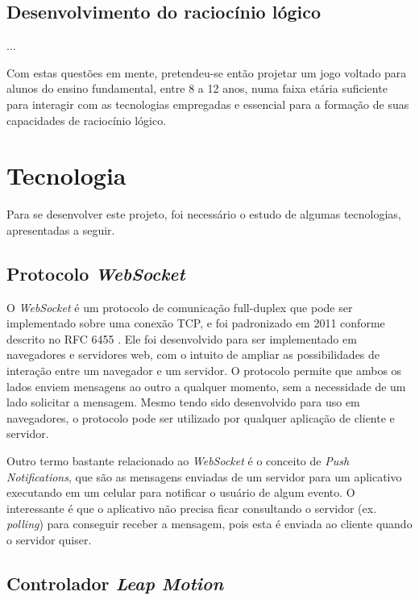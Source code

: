 \subsection{Desenvolvimento do raciocínio lógico}
...

Com estas questões em mente, pretendeu-se então projetar um jogo voltado para
alunos do ensino fundamental, entre 8 a 12 anos, numa faixa etária suficiente
para interagir com as tecnologias empregadas e essencial para a formação de
suas capacidades de raciocínio lógico.


\section{Tecnologia}\label{sec-tecnologia}

Para se desenvolver este projeto, foi necessário o estudo de algumas tecnologias, apresentadas a seguir. 
\subsection{Protocolo \textit{WebSocket}}\label{subsec-teo-websocket}

O \textit{WebSocket} é um protocolo de comunicação full-duplex que pode ser implementado
sobre uma conexão TCP, e foi padronizado em 2011 conforme descrito no RFC 6455
\cite{RFC:2011:websocket}. Ele foi desenvolvido para ser implementado em 
navegadores e servidores web, com o intuito de ampliar as possibilidades de
interação entre um navegador e um servidor. O protocolo permite que ambos os 
lados enviem mensagens ao outro a qualquer momento, sem a necessidade de um 
lado solicitar a mensagem. Mesmo tendo sido desenvolvido para uso em navegadores, 
o protocolo pode ser utilizado por qualquer aplicação de cliente e servidor.

Outro termo bastante relacionado ao \textit{WebSocket} é o conceito de 
\textit{Push Notifications}, que são as mensagens enviadas de um servidor para 
um aplicativo executando em um celular para notificar o usuário de algum evento. 
O interessante é que o aplicativo não precisa ficar consultando o servidor 
(ex. \textit{polling}) para conseguir receber a mensagem, pois esta é enviada 
ao cliente quando o servidor quiser.

\subsection{Controlador \textit{Leap Motion}}\label{subsec-teo-leap-motion}

